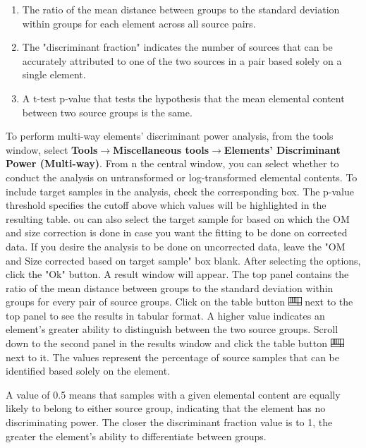\documentclass[12pt]{report}
\begin{document}
\begin{enumerate}
\item The ratio of the mean distance between groups to the standard deviation within groups for each element across all source pairs.
\item The "discriminant fraction" indicates the number of sources that can be accurately attributed to one of the two sources in a pair based solely on a single element.
\item A t-test p-value that tests the hypothesis that the mean elemental content between two source groups is the same.
\end{enumerate}
To perform multi-way elements' discriminant power analysis, from the tools window, select \textbf{Tools}$\rightarrow$\textbf{Miscellaneous tools}$\rightarrow$\textbf{Elements' Discriminant Power (Multi-way)}. From n the central window, you can select whether to conduct the analysis on untransformed or log-transformed elemental contents. To include target samples in the analysis, check the corresponding box. The p-value threshold specifies the cutoff above which values will be highlighted in the resulting table. ou can also select the target sample for based on which the OM and size correction is done in case you want the fitting to be done on corrected data. If you desire the analysis to be done on uncorrected data, leave the "OM and Size corrected based on target sample" box blank. After selecting the options, click the "Ok" button. A result window will appear. The top panel contains the ratio of the mean distance between groups to the standard deviation within groups for every pair of source groups. Click on the table button \includegraphics[width=0.5cm]{Figures/table.png} next to the top panel to see the results in tabular format. A higher value indicates an element's greater ability to distinguish between the two source groups. Scroll down to the second panel in the results window and click the table button \includegraphics[width=0.5cm]{Figures/table.png} next to it. The values represent the percentage of source samples that can be identified based solely on the element.

A value of 0.5 means that samples with a given elemental content are equally likely to belong to either source group, indicating that the element has no discriminating power. The closer the discriminant fraction value is to 1, the greater the element's ability to differentiate between groups. 
\end{document}
